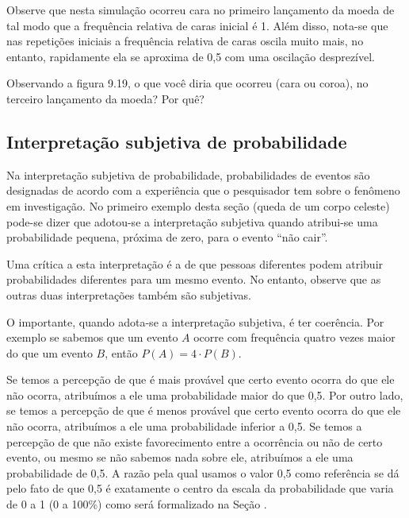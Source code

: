 Observe que nesta simulação ocorreu cara no primeiro lançamento da moeda de tal modo que a frequência relativa de caras inicial é 1.  Além disso, nota-se que nas repetições iniciais a frequência relativa de caras oscila muito mais, no entanto, rapidamente ela se aproxima de 0,5 com uma oscilação desprezível.

Observando a figura 9.19, o que você diria que ocorreu (cara ou coroa), no terceiro lançamento da moeda? Por quê?

\subsection{Interpretação subjetiva de probabilidade}
\label{\detokenize{PE511-1:interpretacao-subjetiva-de-probabilidade}}
Na interpretação subjetiva de probabilidade, probabilidades de eventos são designadas de acordo com a experiência que o pesquisador tem sobre o fenômeno em investigação. No primeiro exemplo desta seção (queda de um corpo celeste) pode-se dizer que adotou-se a interpretação subjetiva quando atribui-se uma probabilidade pequena, próxima de zero, para o evento “não cair”.

Uma crítica a esta interpretação é a de que pessoas diferentes podem atribuir probabilidades diferentes para um mesmo evento. No entanto, observe que as outras duas interpretações também são subjetivas.

O importante, quando adota-se a interpretação subjetiva, é ter coerência. Por exemplo se sabemos que um evento \(A\) ocorre com frequência quatro vezes maior do que um evento \(B\), então \(P(A)=4\cdot P(B)\).

Se temos a percepção de que é mais provável que certo evento ocorra do que ele não ocorra, atribuímos a ele uma probabilidade maior do que 0,5. Por outro lado, se temos a percepção de que é menos provável que certo evento ocorra do que ele não ocorra, atribuímos a ele uma probabilidade inferior a 0,5. Se temos a percepção de que não existe favorecimento entre a ocorrência ou não de certo evento, ou mesmo se não sabemos nada sobre ele, atribuímos a ele uma probabilidade de 0,5. A razão pela qual usamos o valor 0,5 como referência se dá pelo fato de que 0,5 é exatamente o centro da escala da probabilidade que varia de 0 a 1 (0 a 100\%) como será formalizado na Seção {\hyperref[\detokenize{PE511-4:sec-organizando-propriedades}]{}}.


